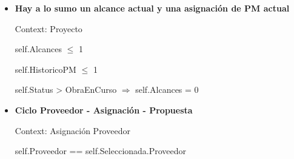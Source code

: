 \begin{itemize}
	\item \textbf{Hay a lo sumo un alcance actual y una asignación de PM actual}
	
			Context: Proyecto
			
			self.Alcances $\leq$ 1
			
			self.HistoricoPM $\leq$ 1
			
			self.Status > ObraEnCurso $\Rightarrow$ self.Alcances = 0
			
	\item \textbf{Ciclo Proveedor - Asignaci\'on - Propuesta}
	
			Context: Asignación Proveedor
			
			self.Proveedor == self.Seleccionada.Proveedor
	
	
\end{itemize}
